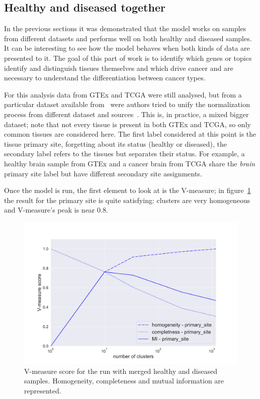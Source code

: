 \subsection{Healthy and diseased together}
In the previous sections it was demonstrated that the model works on samples from different datasets and performs well on both healthy and diseased samples. It can be interesting to see how the model behaves when both kinds of data are presented to it.
The goal of this part of work is to identify which genes or topics identify and distinguish tissues themselves and which drive cancer and are necessary to understand the differentiation between cancer types.

For this analysis data from GTEx and TCGA were still analysed, but from a particular dataset available from~\cite{Wang2017} were authors tried to unify the normalization process from different dataset and sources~\cite{Betel2018}. This is, in practice, a mixed bigger dataset; note that not every tissue is present in both GTEx and TCGA, so only common tissues are considered here. The first label considered at this point is the tissue primary site, forgetting about its status (healthy or diseased), the secondary label refers to the tissues but separates their status. For example, a healthy brain sample from GTEx and a cancer brain from TCGA share the \textit{brain} primary site label but have different secondary site assignments.

Once the model is run, the first element to look at is the V-measure; in figure~\ref{fig:topic/merged/metric_scores_primarysite} the result for the primary site is quite satisfying: clusters are very homogeneous and V-measure's peak is near $0.8$.
\begin{figure}[htb!]
    \centering
    \includegraphics[width=0.8\linewidth]{pictures/topic/merged/metric_scores_primarysite.pdf}
    \caption{V-measure score for the run with merged healthy and diseased samples. Homogeneity, completeness and mutual information are represented.}
    \label{fig:topic/merged/metric_scores_primarysite}
\end{figure}

